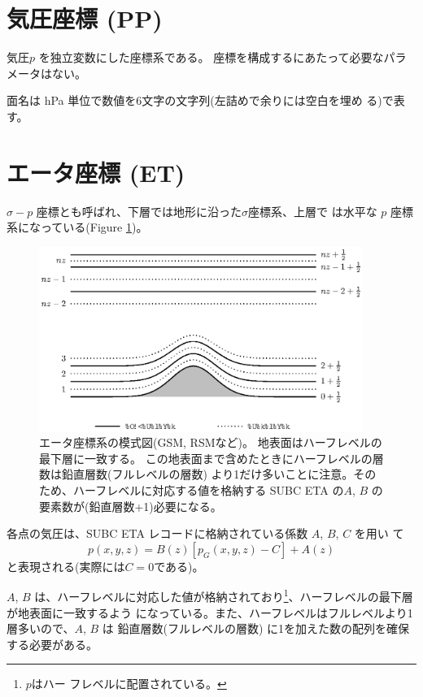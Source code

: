 \label{chap:3dcoord}

\section{気圧座標 (PP)}
気圧$p$ を独立変数にした座標系である。
座標を構成するにあたって必要なパラメータはない。

面名は hPa 単位で数値を6文字の文字列(左詰めで余りには空白を埋め
る)で表す。

\section{エータ座標 (ET)}
$\sigma - p$ 座標とも呼ばれ、下層では地形に沿った$\sigma$座標系、上層で
は水平な $p$ 座標系になっている(Figure \ref{eta_full_half})。

\begin{figure}[h]
\begin{center}
\includegraphics[height=6cm]{eta_full_half.ps}
\end{center}
\caption{エータ座標系の模式図(GSM, RSMなど)。
 地表面はハーフレベルの最下層に一致する。
 この地表面まで含めたときにハーフレベルの層数は鉛直層数(フルレベルの層数)
 より1だけ多いことに注意。そのため、ハーフレベルに対応する値を格納する
 SUBC ETA の$A$, $B$ の要素数が(鉛直層数+1)必要になる。}
\label{eta_full_half}
\end{figure}

各点の気圧は、SUBC ETA レコードに格納されている係数 $A$, $B$, $C$ を用い
て
\[
 p(x, y, z) = B(z)[p_G(x, y, z) - C] + A(z)
\]
と表現される(実際には$C=0$である)。

$A$, $B$ は、ハーフレベルに対応した値が格納されており\footnote{$p$はハー
フレベルに配置されている。}、ハーフレベルの最下層が地表面に一致するよう
になっている。また、ハーフレベルはフルレベルより1層多いので、$A$, $B$ は
鉛直層数(フルレベルの層数) に1を加えた数の配列を確保する必要がある。

